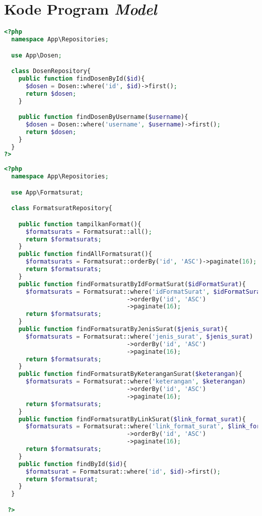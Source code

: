 \chapter{Kode Program \textit{Model}}
\label{lamp:D}


\begin{lstlisting}[language=php, caption=DosenRepository.php]
	<?php
  namespace App\Repositories;

  use App\Dosen;

  class DosenRepository{
    public function findDosenById($id){
      $dosen = Dosen::where('id', $id)->first();
      return $dosen;
    }

    public function findDosenByUsername($username){
      $dosen = Dosen::where('username', $username)->first();
      return $dosen;
    }
  }
?>
\end{lstlisting}

\begin{lstlisting}[language=php, caption=FormatsuratRepository.php]
	<?php
  namespace App\Repositories;

  use App\Formatsurat;

  class FormatsuratRepository{

    public function tampilkanFormat(){
      $formatsurats = Formatsurat::all();
      return $formatsurats;
    }
    public function findAllFormatsurat(){
      $formatsurats = Formatsurat::orderBy('id', 'ASC')->paginate(16);
      return $formatsurats;
    }
    public function findFormatsuratByIdFormatSurat($idFormatSurat){
      $formatsurats = Formatsurat::where('idFormatSurat', $idFormatSurat)
                                  ->orderBy('id', 'ASC')
                                  ->paginate(16);
      return $formatsurats;
    }
    public function findFormatsuratByJenisSurat($jenis_surat){
      $formatsurats = Formatsurat::where('jenis_surat', $jenis_surat)
                                  ->orderBy('id', 'ASC')
                                  ->paginate(16);
      return $formatsurats;
    }
    public function findFormatsuratByKeteranganSurat($keterangan){
      $formatsurats = Formatsurat::where('keterangan', $keterangan)
                                  ->orderBy('id', 'ASC')
                                  ->paginate(16);
      return $formatsurats;
    }
    public function findFormatsuratByLinkSurat($link_format_surat){
      $formatsurats = Formatsurat::where('link_format_surat', $link_format_surat)
                                  ->orderBy('id', 'ASC')
                                  ->paginate(16);
      return $formatsurats;
    }
    public function findById($id){
      $formatsurat = Formatsurat::where('id', $id)->first();
      return $formatsurat;
    }
  }

 ?>

\end{lstlisting}

